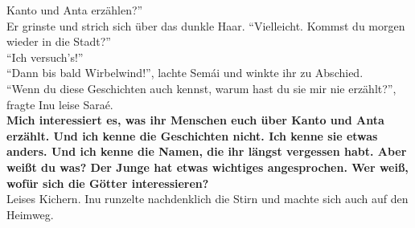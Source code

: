 \documentclass[a4paper,12pt]{book}
\begin{document}
Kanto und Anta erzählen?''\\
Er grinste und strich sich über das dunkle Haar. ``Vielleicht. Kommst du morgen wieder in die 
Stadt?''\\
``Ich versuch's!''\\
``Dann bis bald Wirbelwind!'', lachte Semái und winkte ihr zu Abschied.\\
``Wenn du diese Geschichten auch kennst, warum hast du sie mir nie erzählt?'', fragte Inu leise 
Saraé.\\
\textbf{Mich interessiert es, was ihr Menschen euch über Kanto und Anta erzählt. Und ich kenne die 
Geschichten nicht. Ich kenne sie etwas anders. Und ich kenne die Namen, die ihr längst vergessen 
habt. Aber weißt du was? Der Junge hat etwas wichtiges angesprochen. Wer weiß, wofür sich die 
Götter interessieren?}\\
Leises Kichern. Inu runzelte nachdenklich die Stirn und machte sich auch auf den Heimweg. \\
\end{document}
